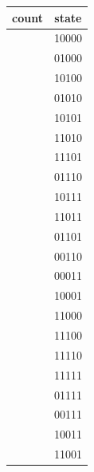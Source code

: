 \documentclass{article}
\begin{document}
\begin{center}
\begin{tabular}{c|c}
count & state \\ \hline
[0] & 10000 \\ \hline
[1] & 01000 \\ \hline
[2] & 10100 \\ \hline
[3] & 01010 \\ \hline
[4] & 10101 \\ \hline
[5] & 11010 \\ \hline
[6] & 11101 \\ \hline
[7] & 01110 \\ \hline
[8] & 10111 \\ \hline
[9] & 11011 \\ \hline
[10] & 01101 \\ \hline
[11] & 00110 \\ \hline
[12] & 00011 \\ \hline
[13] & 10001 \\ \hline
[14] & 11000 \\ \hline
[15] & 11100 \\ \hline
[16] & 11110 \\ \hline
[17] & 11111 \\ \hline
[18] & 01111 \\ \hline
[19] & 00111 \\ \hline
[20] & 10011 \\ \hline
[21] & 11001 \\ \hline
\end{tabular}
\end{center}
\end{document}
